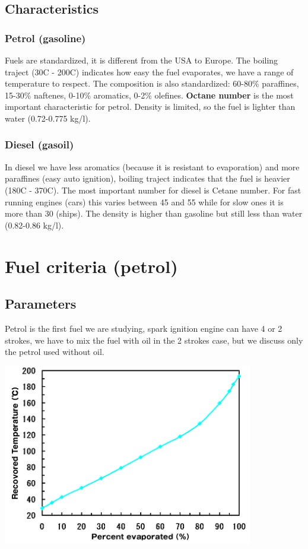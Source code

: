 \subsection{Characteristics}
\subsubsection{Petrol (gasoline)}
	Fuels are standardized, it is different from the USA to Europe. The boiling traject (30\degres C - 200\degres C) indicates how easy the fuel evaporates, we have a range of temperature to respect. The composition is also standardized: 60-80\% paraffines, 15-30\% naftenes, 0-10\% aromatics, 0-2\% olefines. \textbf{Octane number} is the most important characteristic for petrol. Density is limited, so the fuel is lighter than water (0.72-0.775 kg/l).
	
\subsubsection{Diesel (gasoil)} 
In diesel we have less aromatics (because it is resistant to evaporation) and more paraffines (easy auto ignition), boiling traject indicates that the fuel is heavier (180\degres C - 370\degres C). The most important number for diesel is Cetane number. For fast running engines (cars) this varies between 45 and 55 while for slow ones it is more than 30 (ships). The density is higher than gasoline but still less than water (0.82-0.86 kg/l).

\section{Fuel criteria (petrol)}
\subsection{Parameters}
	Petrol is the first fuel we are studying, spark ignition engine can have 4 or 2 strokes, we have to mix the fuel with oil in the 2 strokes case, but we discuss only the petrol used without oil. 
	
	\begin{center}
	\includegraphics[scale=1]{ch3/3}
	\label{fig:3.3}
	\end{center}
	
